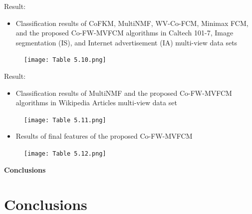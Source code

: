 \documentclass[compress,sky blue]{beamer}
\begin{document}
\begin{frame}{Result:  }
\vspace{-0.5cm}
\begin{itemize}
\item \scriptsize{Classification results of CoFKM, MultiNMF, WV-Co-FCM, Minimax FCM, and the proposed Co-FW-MVFCM algorithms in Caltech 101-7, Image segmentation (IS), and Internet advertisement (IA) multi-view data sets}
\end{itemize}


\begin{figure}
\texttt{[image: Table 5.10.png]}
\end{figure}
\end{frame}

\begin{frame}{Result:  }
\vspace{-0.5cm}
\begin{itemize}
\item \scriptsize{Classification results of MultiNMF and the proposed Co-FW-MVFCM algorithms in Wikipedia Articles multi-view data set}
\end{itemize}
\begin{figure}
\texttt{[image: Table 5.11.png]}
\end{figure}
\begin{itemize}
\item \scriptsize{Results of final features of the proposed Co-FW-MVFCM}
\end{itemize}
\begin{figure}
\texttt{[image: Table 5.12.png]}
\end{figure}
\end{frame}


\begin{frame}{}
    \centering
    \Huge{\textbf{Conclusions}}
\end{frame}


\section{Conclusions }
\end{document}
